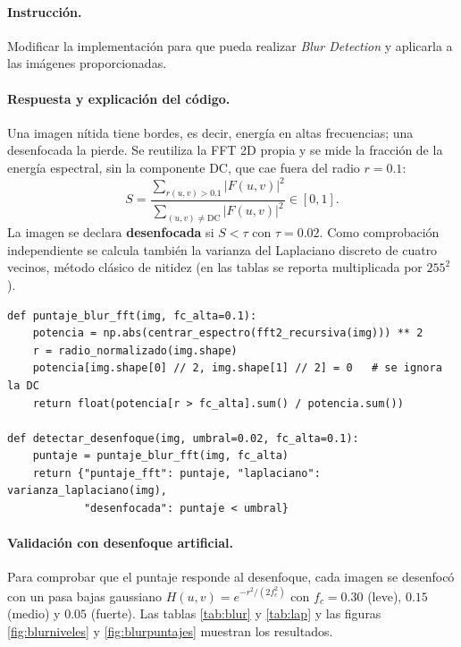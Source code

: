 \documentclass[11pt]{article}
\begin{document}
\paragraph{Instrucción.}
Modificar la implementación para que pueda realizar \textit{Blur Detection} y aplicarla a las imágenes proporcionadas.

\paragraph{Respuesta y explicación del código.}
Una imagen nítida tiene bordes, es decir, energía en altas frecuencias; una desenfocada la pierde. Se reutiliza la FFT 2D propia
y se mide la fracción de la energía espectral, sin la componente DC, que cae fuera del radio $r=0.1$:
\begin{equation}
 S=\frac{\sum_{r(u,v)>0.1}|F(u,v)|^2}{\sum_{(u,v)\ne\mathrm{DC}}|F(u,v)|^2}\in[0,1].
\end{equation}
La imagen se declara \textbf{desenfocada} si $S<\tau$ con $\tau=0.02$. Como comprobación independiente se calcula también la
varianza del Laplaciano discreto de cuatro vecinos, método clásico de nitidez (en las tablas se reporta multiplicada por
$255^2$).

\begin{lstlisting}
def puntaje_blur_fft(img, fc_alta=0.1):
    potencia = np.abs(centrar_espectro(fft2_recursiva(img))) ** 2
    r = radio_normalizado(img.shape)
    potencia[img.shape[0] // 2, img.shape[1] // 2] = 0   # se ignora la DC
    return float(potencia[r > fc_alta].sum() / potencia.sum())

def detectar_desenfoque(img, umbral=0.02, fc_alta=0.1):
    puntaje = puntaje_blur_fft(img, fc_alta)
    return {"puntaje_fft": puntaje, "laplaciano": varianza_laplaciano(img),
            "desenfocada": puntaje < umbral}
\end{lstlisting}

\paragraph{Validación con desenfoque artificial.}
Para comprobar que el puntaje responde al desenfoque, cada imagen se desenfocó con un pasa bajas gaussiano
$H(u,v)=e^{-r^2/(2f_c^2)}$ con $f_c=0.30$ (leve), $0.15$ (medio) y $0.05$ (fuerte). Las tablas \ref{tab:blur} y \ref{tab:lap}
y las figuras \ref{fig:blurniveles} y \ref{fig:blurpuntajes} muestran los resultados.
\end{document}

